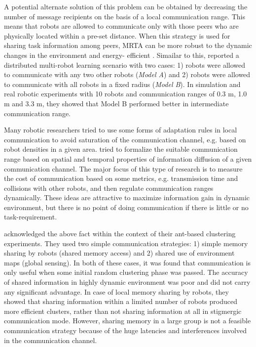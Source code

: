 \documentclass{intech}
\begin{document}
A potential alternate solution of this problem can be obtained by decreasing the number of message recipients on the basis of a local communication range. This means that robots are allowed to communicate only with those peers who are physically located within a pre-set distance. When this strategy is used for sharing task information among peers, MRTA can be more robust to the dynamic changes in the environment and energy- efficient \citep{Agassounon+2002}. Simailar to this, \cite{Pugh+2009} reported a distributed multi-robot learning scenario with two cases: 1) robots were allowed to communicate with any two other robots ({\em Model A}) and 2)  robots were allowed to communicate with all robots in a fixed radius ({\em Model B}). In simulation and real robotic experiments with 10 robots and communication ranges of 0.3 m, 1.0 m and 3.3 m, they showed that Model B performed better in intermediate communication range. 

Many robotic researchers tried to use some forms of adaptation rules in local communication to avoid saturation of the communication channel, e.g. based on robot densities in a given area. \cite{Yoshida+2000} tried to formalize the suitable communication range based on spatial and temporal properties of information diffusion of a given communication channel. The major focus of this type of research is to measure the cost of communication based on some metrics, e.g.  transmission time and collisions with other robots, and then regulate communication ranges dynamically. These ideas are attractive to maximize information gain in dynamic environment, but there is no point of doing communication if there is little or no task-requirement. 

\cite{Oca+2005} acknowledged the above fact within the context of their ant-based clustering experiments. They used two simple communication strategies: 1) simple memory sharing by robots (shared memory access) and 2) shared use of environment maps (global sensing). In both of these cases, it was found that communication is only useful when some initial random clustering phase was passed. The accuracy of shared information in highly dynamic environment was poor and did not carry any significant advantage. In case of local memory sharing by robots, they showed that  sharing information within a limited number of robots produced more efficient  clusters, rather than  not sharing information at all in stigmergic communication mode. However, sharing memory in a large group is not a feasible communication strategy because of the huge latencies and interferences involved in the communication channel.
\end{document}

